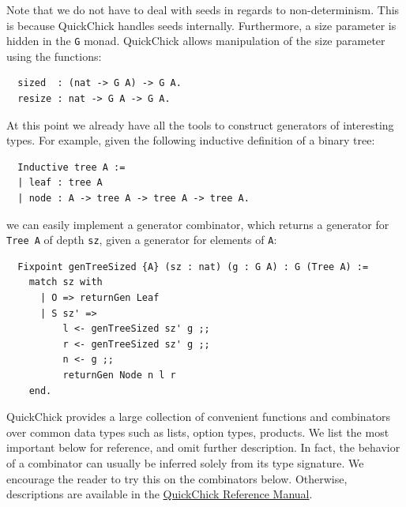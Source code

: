\documentclass[twoside,11pt,openright]{report}
\newenvironment{code}{\captionsetup{type=figure, singlelinecheck=off, justification=raggedleft}}{}
\newcommand{\coq}[1]{\texttt{#1}}
\begin{document}
Note that we do not have to deal with seeds in regards to non-determinism. This is because QuickChick handles seeds internally. Furthermore, a size parameter is hidden in the \coq{G} monad. QuickChick allows manipulation of the size parameter using the functions:
\begin{code}
\label{def:sized-resize}
\begin{verbatim}
  sized  : (nat -> G A) -> G A.
  resize : nat -> G A -> G A.
\end{verbatim}
\end{code}
At this point we already have all the tools to construct generators of interesting types. For example, given the following inductive definition of a binary tree:
\begin{code}
\label{def:tree}
\begin{verbatim}
  Inductive tree A :=
  | leaf : tree A
  | node : A -> tree A -> tree A -> tree A.
\end{verbatim}
\end{code}
we can easily implement a generator combinator, which returns a generator for \coq{Tree A} of depth \coq{sz}, given a generator for elements of \coq{A}:
\begin{code}
\label{def:genTreeSized}
\begin{verbatim}
  Fixpoint genTreeSized {A} (sz : nat) (g : G A) : G (Tree A) :=
    match sz with
      | O => returnGen Leaf
      | S sz' =>
          l <- genTreeSized sz' g ;;
          r <- genTreeSized sz' g ;;
          n <- g ;;
          returnGen Node n l r
    end.
\end{verbatim}
\end{code}
QuickChick provides a large collection of convenient functions and combinators over common data types such as lists, option types, products. We list the most important below for reference, and omit further description. In fact, the behavior of a combinator can usually be inferred solely from its type signature. We encourage the reader to try this on the combinators below. Otherwise, descriptions are available in the \href{https://softwarefoundations.cis.upenn.edu/qc-current/QuickChickInterface.html}{QuickChick Reference Manual}.
\end{document}
